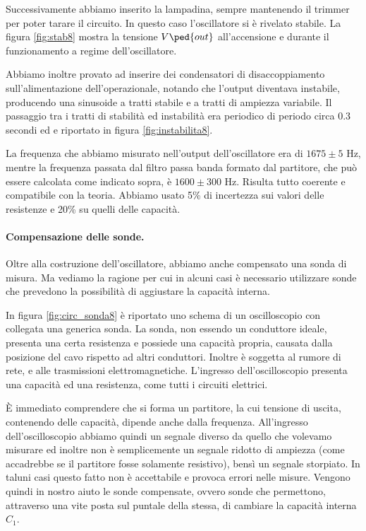 Successivamente abbiamo inserito la lampadina, sempre mantenendo il trimmer per poter tarare il circuito. In questo caso l'oscillatore
si è rivelato stabile. La figura \ref{fig:stab8} mostra la tensione $V\ped{out}$ all'accensione e durante il funzionamento a regime dell'oscillatore.

Abbiamo inoltre provato ad inserire dei condensatori di disaccoppiamento sull'alimentazione dell'operazionale, notando che
l'output diventava instabile, producendo una sinusoide a tratti stabile e a tratti di ampiezza variabile.
Il passaggio tra i tratti di stabilità ed instabilità era periodico di periodo circa 0.3 secondi ed e riportato in figura \ref{fig:instabilita8}.

La frequenza che abbiamo misurato nell'output dell'oscillatore era di $1675 \pm 5$ Hz, mentre la frequenza passata
dal filtro passa banda formato dal partitore, che può essere calcolata come indicato sopra, è $1600 \pm 300$ Hz. Risulta
tutto coerente e compatibile con la teoria. Abbiamo usato 5\% di incertezza sui valori delle resistenze e 20\% su quelli
delle capacità.

\paragraph{Compensazione delle sonde.}

Oltre alla costruzione dell'oscillatore, abbiamo anche compensato una sonda di misura. Ma vediamo la ragione per cui
in alcuni casi è necessario utilizzare sonde che prevedono la possibilità di aggiustare la capacità interna.

In figura \ref{fig:circ_sonda8} è riportato uno schema di un oscilloscopio con collegata una generica sonda.
La sonda, non essendo un conduttore ideale, presenta una certa resistenza e possiede una capacità propria, causata
dalla posizione del cavo rispetto ad altri conduttori. Inoltre è soggetta al rumore di rete, e alle trasmissioni
elettromagnetiche. L'ingresso dell'oscilloscopio presenta una capacità ed una resistenza, come tutti i circuiti elettrici.

È immediato comprendere che si forma un partitore, la cui tensione di uscita, contenendo delle capacità, dipende anche dalla
frequenza. All'ingresso dell'oscilloscopio abbiamo quindi un segnale diverso da quello che volevamo misurare ed inoltre non
è semplicemente un segnale ridotto di ampiezza (come accadrebbe se il partitore fosse solamente resistivo),
bensì un segnale storpiato. In taluni casi questo fatto non è accettabile e provoca errori nelle misure.
Vengono quindi in nostro aiuto le sonde compensate, ovvero sonde che permettono, attraverso una vite posta sul
puntale della stessa, di cambiare la capacità interna $C_1$.

